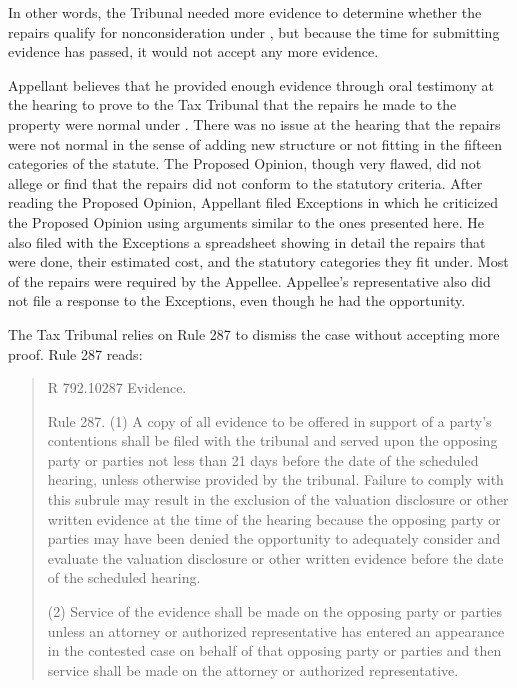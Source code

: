 \documentclass[12pt,\documentclassflag]{michiganCourtOfAppealsBrief}
\def\mathieuGast{\pincite[l]{MCL}{211.27(2)}}
\begin{document}
In other words, the Tribunal needed more evidence to determine whether the repairs qualify for nonconsideration under , but because the time for submitting evidence has passed, it would not accept any more evidence. 

Appellant believes that he provided enough evidence through oral testimony at the hearing to prove to the Tax Tribunal that the repairs he made to the property were normal under \mathieuGast. There was no issue at the hearing that the repairs were not normal in the sense of adding new structure or not fitting in the fifteen categories of the statute. The Proposed Opinion, though very flawed, did not allege or find that the repairs did not conform to the statutory criteria. After reading the Proposed Opinion, Appellant filed Exceptions in which he criticized the Proposed Opinion using arguments similar to the ones presented here. He also filed with the Exceptions a spreadsheet showing in detail the repairs that were done, their estimated cost, and the statutory categories they fit under. Most of the repairs were required by the Appellee. Appellee's representative also did not file a response to the Exceptions, even though he had the opportunity.

The Tax Tribunal relies on Rule 287 to dismiss the case without accepting more proof. Rule 287 reads:

\begin{quote}
  R 792.10287 Evidence.
  
  Rule 287. (1) A copy of all evidence to be offered in support of a party’s contentions shall be filed with the tribunal and served upon the opposing party or parties not less than 21 days before the date of the scheduled hearing, unless otherwise provided by the tribunal. Failure to comply with this subrule may result in the exclusion of the valuation disclosure or other written evidence at the time of the hearing because the opposing party or parties may have been denied the opportunity to adequately consider and evaluate the valuation disclosure or other written evidence before the date of the scheduled hearing.
  
(2) Service of the evidence shall be made on the opposing party or parties unless an attorney or authorized representative has entered an appearance in the contested case on behalf of that opposing party or parties and then service shall be made on the attorney or authorized representative.
\end{quote}
\end{document}
